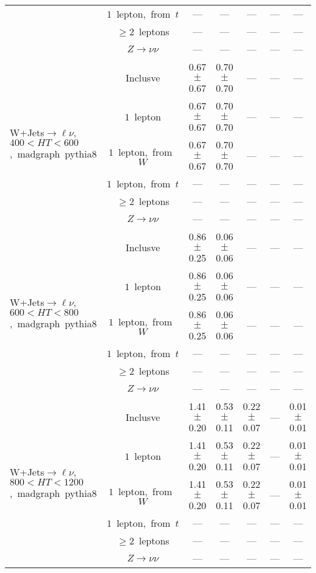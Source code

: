 \documentclass{article}
\begin{document}
\begin{longtable}{|l|c|c|c|c|c|c|}
 & $1$~lepton,~from~$t$  & ---  & ---  & ---  & ---  & --- \\* 
 & $\ge2$~leptons  & ---  & ---  & ---  & ---  & --- \\* 
 & $Z\rightarrow\nu\nu$  & ---  & ---  & ---  & ---  & --- \\* 
\hline 
\multirow{6}{*}{W+Jets$\rightarrow\ell\nu$,~$400<HT<600$,~madgraph~pythia8} & Inclusve  & 0.67 $\pm$ 0.67  & 0.70 $\pm$ 0.70  & ---  & ---  & --- \\* 
 & $1$~lepton  & 0.67 $\pm$ 0.67  & 0.70 $\pm$ 0.70  & ---  & ---  & --- \\* 
 & $1$~lepton,~from~$W$  & 0.67 $\pm$ 0.67  & 0.70 $\pm$ 0.70  & ---  & ---  & --- \\* 
 & $1$~lepton,~from~$t$  & ---  & ---  & ---  & ---  & --- \\* 
 & $\ge2$~leptons  & ---  & ---  & ---  & ---  & --- \\* 
 & $Z\rightarrow\nu\nu$  & ---  & ---  & ---  & ---  & --- \\* 
\hline 
\multirow{6}{*}{W+Jets$\rightarrow\ell\nu$,~$600<HT<800$,~madgraph~pythia8} & Inclusve  & 0.86 $\pm$ 0.25  & 0.06 $\pm$ 0.06  & ---  & ---  & --- \\* 
 & $1$~lepton  & 0.86 $\pm$ 0.25  & 0.06 $\pm$ 0.06  & ---  & ---  & --- \\* 
 & $1$~lepton,~from~$W$  & 0.86 $\pm$ 0.25  & 0.06 $\pm$ 0.06  & ---  & ---  & --- \\* 
 & $1$~lepton,~from~$t$  & ---  & ---  & ---  & ---  & --- \\* 
 & $\ge2$~leptons  & ---  & ---  & ---  & ---  & --- \\* 
 & $Z\rightarrow\nu\nu$  & ---  & ---  & ---  & ---  & --- \\* 
\hline 
\multirow{6}{*}{W+Jets$\rightarrow\ell\nu$,~$800<HT<1200$,~madgraph~pythia8} & Inclusve  & 1.41 $\pm$ 0.20  & 0.53 $\pm$ 0.11  & 0.22 $\pm$ 0.07  & ---  & 0.01 $\pm$ 0.01 \\* 
 & $1$~lepton  & 1.41 $\pm$ 0.20  & 0.53 $\pm$ 0.11  & 0.22 $\pm$ 0.07  & ---  & 0.01 $\pm$ 0.01 \\* 
 & $1$~lepton,~from~$W$  & 1.41 $\pm$ 0.20  & 0.53 $\pm$ 0.11  & 0.22 $\pm$ 0.07  & ---  & 0.01 $\pm$ 0.01 \\* 
 & $1$~lepton,~from~$t$  & ---  & ---  & ---  & ---  & --- \\* 
 & $\ge2$~leptons  & ---  & ---  & ---  & ---  & --- \\* 
 & $Z\rightarrow\nu\nu$  & ---  & ---  & ---  & ---  & --- \\* 

\end{longtable}
\end{document}
